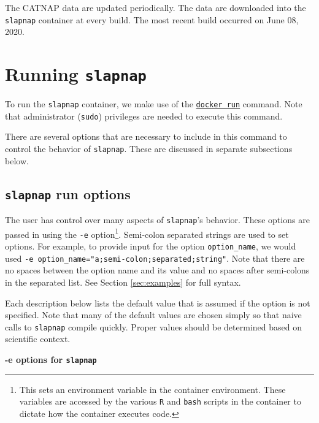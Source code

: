 \documentclass[]{article}
\begin{document}
The CATNAP data are updated periodically. The data are downloaded into
the \texttt{slapnap} container at every build. The most recent build
occurred on June 08, 2020.

\section{\texorpdfstring{Running
\texttt{slapnap}}{Running slapnap}}\label{sec:runningcontainer}

To run the \texttt{slapnap} container, we make use of the
\href{https://docs.docker.com/engine/reference/run/}{\texttt{docker\ run}}
command. Note that administrator (\texttt{sudo}) privileges are needed
to execute this command.

There are several options that are necessary to include in this command
to control the behavior of \texttt{slapnap}. These are discussed in
separate subsections below.

\subsection{\texorpdfstring{\texttt{slapnap} run
options}{slapnap run options}}\label{sec:opts}

The user has control over many aspects of \texttt{slapnap}'s behavior.
These options are passed in using the \texttt{-e} option\footnote{This
  sets an environment variable in the container environment. These
  variables are accessed by the various \texttt{R} and \texttt{bash}
  scripts in the container to dictate how the container executes code.}.
Semi-colon separated strings are used to set options. For example, to
provide input for the option \texttt{option\_name}, we would used
\texttt{-e\ option\_name="a;semi-colon;separated;string"}. Note that
there are no spaces between the option name and its value and no spaces
after semi-colons in the separated list. See Section \ref{sec:examples}
for full syntax.

Each description below lists the default value that is assumed if the
option is not specified. Note that many of the default values are chosen
simply so that naive calls to \texttt{slapnap} compile quickly. Proper
values should be determined based on scientific context.

\textbf{-e options for \texttt{slapnap}}
\end{document}
